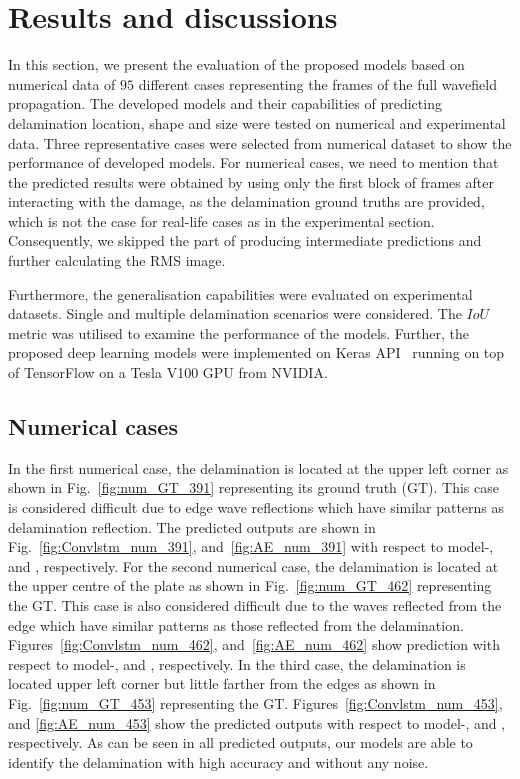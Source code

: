 \section{Results and discussions}
In this section,  we present the evaluation of the proposed models based on numerical data of \(95\) different cases representing the frames of the full wavefield propagation. 
The developed models and their capabilities of predicting delamination location, shape and size were tested on numerical and experimental data.
Three representative cases were selected from numerical dataset to show the performance of developed models.
For numerical cases, we need to mention that the predicted results were obtained by using only the first block of frames after interacting with the damage, as the delamination ground truths are provided, which is not the case for real-life cases as in the experimental section. 
Consequently, we skipped the part of producing intermediate predictions and further calculating the RMS image.

Furthermore, the generalisation capabilities were evaluated on experimental datasets.
Single and multiple delamination scenarios were considered.
The \(IoU\) metric was utilised to examine the performance of the models.
Further, the proposed deep learning models were implemented
on Keras API~\cite{chollet2015keras} running on top of TensorFlow on a Tesla V100 GPU  from NVIDIA. 
\subsection{Numerical cases}
In the first numerical case, the delamination is located at the upper left corner as shown in Fig.~\ref{fig:num_GT_391} representing its ground truth (GT).
This case is considered difficult due to edge wave reflections which have similar patterns as delamination reflection.
The predicted outputs are shown in Fig.~\ref{fig:Convlstm_num_391}, and~\ref{fig:AE_num_391} with respect to model-, and , respectively.
For the second numerical case, the delamination is located at the upper centre of the plate as shown in Fig.~\ref{fig:num_GT_462} representing the GT.
This case is also considered difficult due to the waves reflected from the edge which have similar patterns as those reflected from the delamination.
Figures~\ref{fig:Convlstm_num_462}, and~\ref{fig:AE_num_462} show prediction with respect to model-, and , respectively.
In the third case, the delamination is located upper left corner but little farther from the edges as shown in Fig.~\ref{fig:num_GT_453} representing the GT. 
Figures~\ref{fig:Convlstm_num_453}, and \ref{fig:AE_num_453} show the predicted outputs with respect to model-, and , respectively.
As can be seen in all predicted outputs, our models are able to identify the delamination with high accuracy and without any noise.

